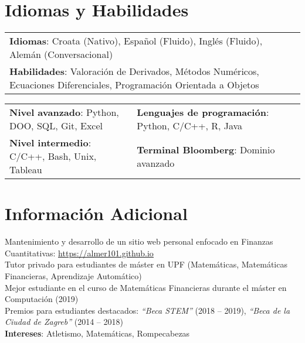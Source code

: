\documentclass[letterpaper,10pt]{article}
\begin{document}
%
\section{Idiomas y Habilidades}
\begin{center}
\begin{tabularx}{0.96\textwidth} { 
  >{\raggedright\arraybackslash}X
}
  \small{\textbf{Idiomas}: Croata (Nativo), Español (Fluido), Inglés (Fluido), Alemán (Conversacional)}\\
  \small{\textbf{Habilidades}: Valoración de Derivados, Métodos Numéricos, Ecuaciones Diferenciales, Programación Orientada a Objetos}
\end{tabularx}
\end{center}

\begin{center}
\begin{tabularx}{0.96\textwidth} { 
  >{\raggedright\arraybackslash}X 
   >{\raggedright\arraybackslash}X 
   >{\raggedright\arraybackslash}X 
   >{\raggedright\arraybackslash}X
}
\small{\textbf{Nivel avanzado}: Python, DOO, SQL, Git, Excel} & \small{\hspace{3pt}\textbf{Lenguajes de programación}: Python, C/C++, R, Java} \\
\small{\textbf{Nivel intermedio}: C/C++, Bash, Unix, Tableau} & \small{\hspace{3pt}\textbf{Terminal Bloomberg}: Dominio avanzado} \\
\end{tabularx}
\end{center}


\section{Información Adicional}
\begin{itemize}[leftmargin=0.15in, label={}]
  \small{\item{
  	 Mantenimiento y desarrollo de un sitio web personal enfocado en Finanzas Cuantitativas: \href{https://almer101.github.io/intro.html}{\underline{https://almer101.github.io}}\\
  	 Tutor privado para estudiantes de máster en UPF (Matemáticas, Matemáticas Financieras, Aprendizaje Automático)\\
     Mejor estudiante en el curso de Matemáticas Financieras durante el máster en Computación (2019) \\
     Premios para estudiantes destacados: \textit{“Beca STEM”} (2018 – 2019), \textit{“Beca de la Ciudad de Zagreb”} (2014 – 2018) \\ \vspace{3pt}
     \textbf{Intereses}: Atletismo, Matemáticas, Rompecabezas
    }}
\end{itemize}


\end{document}
